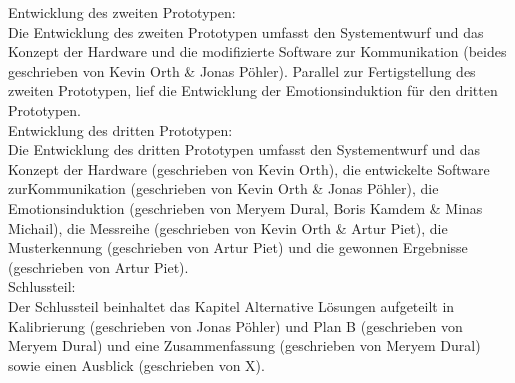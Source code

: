 Entwicklung des zweiten Prototypen: \\

Die Entwicklung des zweiten Prototypen umfasst den Systementwurf und das Konzept der Hardware und die modifizierte Software zur Kommunikation (beides  geschrieben von Kevin Orth \& Jonas Pöhler). 
Parallel zur Fertigstellung des zweiten Prototypen, lief die Entwicklung der Emotionsinduktion für den dritten Prototypen. \\

Entwicklung des dritten Prototypen: \\

Die Entwicklung des dritten Prototypen umfasst den Systementwurf und das Konzept der Hardware (geschrieben von Kevin Orth), die entwickelte Software zurKommunikation (geschrieben von Kevin Orth \& Jonas Pöhler), die Emotionsinduktion (geschrieben von Meryem Dural, Boris Kamdem \& Minas Michail), die Messreihe (geschrieben von Kevin Orth \& Artur Piet), die Musterkennung (geschrieben von Artur Piet) und die gewonnen Ergebnisse (geschrieben von Artur Piet). \\

Schlussteil: \\

Der Schlussteil beinhaltet das Kapitel Alternative Lösungen aufgeteilt in Kalibrierung (geschrieben von Jonas Pöhler) und Plan B (geschrieben von Meryem Dural) und eine Zusammenfassung (geschrieben von Meryem Dural) sowie einen Ausblick (geschrieben von X).
